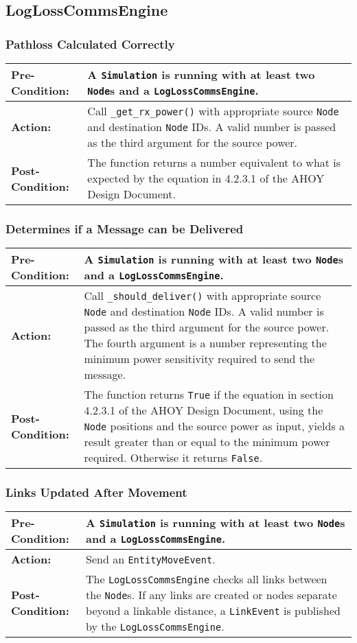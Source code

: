 \documentclass[titlepage]{article}
\newcommand{\testcase}[3]{
    \begin{center}
    \begin{tabular}{| l | p{0.7\textwidth}|}
        \hline
        \rowcolor[gray]{0.8}\textbf{Pre-Condition:} & #1 \\ \hline
        \textbf{Action:} & #2 \\ \hline
        \rowcolor[gray]{0.8}\textbf{Post-Condition:} & #3 \\ \hline
    \end{tabular}
    \end{center}
}
\begin{document}

\subsection{LogLossCommsEngine}
\subsubsection{Pathloss Calculated Correctly}
\testcase{A \texttt{Simulation} is running with at least two \texttt{Node}s and a \texttt{LogLossCommsEngine}. }{Call \texttt{\_get\_rx\_power()} with appropriate source \texttt{Node} and destination \texttt{Node} IDs. A valid number is passed as the third argument for the source power.}{The function returns a number equivalent to what is expected by the equation in 4.2.3.1 of the AHOY Design Document.}

\subsubsection{Determines if a Message can be Delivered}
\testcase{A \texttt{Simulation} is running with at least two \texttt{Node}s and a \texttt{LogLossCommsEngine}.}{Call \texttt{\_should\_deliver()} with appropriate source \texttt{Node} and destination \texttt{Node} IDs. A valid number is passed as the third argument for the source power. The fourth argument is a number representing the minimum power sensitivity required to send the message.}{The function returns \texttt{True} if the equation in section 4.2.3.1 of the AHOY Design Document, using the \texttt{Node} positions and the source power as input, yields a result greater than or equal to the minimum power required. Otherwise it returns \texttt{False}.}

\subsubsection{Links Updated After Movement}
\testcase{A \texttt{Simulation} is running with at least two \texttt{Node}s and a \texttt{LogLossCommsEngine}.}{Send an \texttt{EntityMoveEvent}.}{The \texttt{LogLossCommsEngine} checks all links between the \texttt{Node}s. If any links are created or nodes separate beyond a linkable distance, a \texttt{LinkEvent} is published by the \texttt{LogLossCommsEngine}.}
\end{document}
